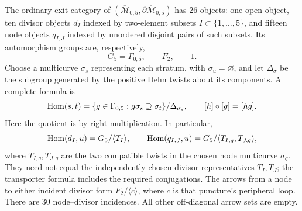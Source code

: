 \begin{proposition}\label{P1e3}
The ordinary exit category of
$(\overline{\mathcal M}_{0,5},\partial\overline{\mathcal M}_{0,5})$
has $26$ objects: one open object, ten divisor objects $d_I$ indexed by
two-element subsets $I\subset\{1,\ldots,5\}$, and fifteen node objects
$q_{I,J}$ indexed by unordered disjoint pairs of such subsets. Its
automorphism groups are, respectively,
\[
 G_5=\Gamma_{0,5},\qquad F_2,\qquad 1.
\]
Choose a multicurve $\sigma_s$ representing each stratum, with
$\sigma_u=\varnothing$, and let $\Delta_\sigma$ be the subgroup generated
by the positive Dehn twists about its components. A complete formula is
\begin{equation}\label{eq:M05-transporter}
 \operatorname{Hom}(s,t)=
 \{g\in\Gamma_{0,5}:g\sigma_s\supseteq\sigma_t\}/\Delta_{\sigma_s},
 \qquad [h]\circ[g]=[hg].
\end{equation}
Here the quotient is by right multiplication. In particular,
\[
 \operatorname{Hom}(d_I,u)=G_5/\langle T_I\rangle,\qquad
 \operatorname{Hom}(q_{I,J},u)=G_5/\langle T_{I,q},T_{J,q}\rangle,
\]
where $T_{I,q},T_{J,q}$ are the two compatible twists in the chosen
node multicurve $\sigma_q$. They need not equal the independently
chosen divisor representatives $T_I,T_J$; the transporter formula
includes the required conjugations.
The arrows from a node to either incident divisor form
$F_2/\langle c\rangle$, where $c$ is that puncture's peripheral loop.
There are $30$ node--divisor incidences. All other off-diagonal arrow
sets are empty.
\end{proposition}
